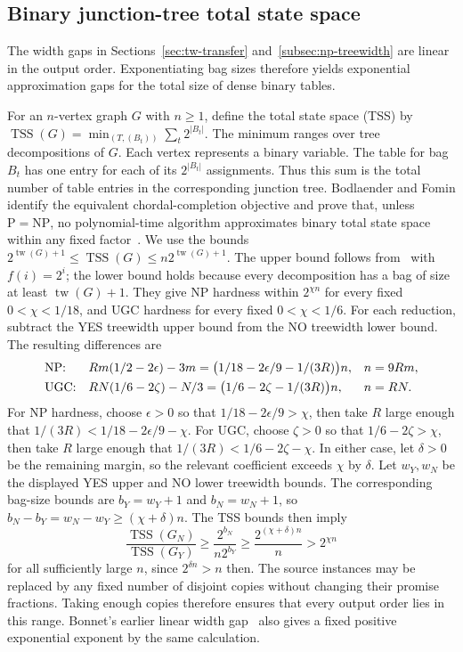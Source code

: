 \subsection{Binary junction-tree total state space}

The width gaps in Sections~\ref{sec:tw-transfer}
and~\ref{subsec:np-treewidth} are linear in the
output order. Exponentiating bag sizes therefore yields exponential
approximation gaps for the total size of dense binary tables.

For an $n$-vertex graph $G$ with $n\ge1$, define the total state space
(TSS) by $\operatorname{TSS}(G)=\min_{(T,(B_t))}\sum_t2^{|B_t|}$.
The minimum ranges over tree decompositions of $G$.
Each vertex represents a binary variable. The table for bag
$B_t$ has one entry for each of its $2^{|B_t|}$ assignments.
Thus this sum is the total number of table entries in the
corresponding junction tree.
Bodlaender and Fomin identify the equivalent chordal-completion
objective and prove that, unless $\mathrm{P}=\mathrm{NP}$, no
polynomial-time algorithm approximates binary total state space within
any fixed factor~\cite[Lemma 2, Section 8, and Theorem 32]{BodlaenderFomin2005}.
We use the bounds
$2^{\operatorname{tw}(G)+1}\leq\operatorname{TSS}(G)\leq n2^{\operatorname{tw}(G)+1}$.
The upper bound follows from~\cite[Lemma~4]{BodlaenderFomin2005} with
$f(i)=2^i$; the lower bound holds because every decomposition has a bag
of size at least $\operatorname{tw}(G)+1$. They give
\textup{NP} hardness within $2^{\chi n}$ for every fixed $0<\chi<1/18$,
and \textup{UGC} hardness for every fixed $0<\chi<1/6$.
For each reduction, subtract the YES treewidth upper bound from the
NO treewidth lower bound. The resulting differences are
\[
 \begin{array}{lll}
 \textup{NP:}&Rm(1/2-2\epsilon)-3m
   =\bigl(1/18-2\epsilon/9-1/(3R)\bigr)n,
   &n=9Rm,\\[4pt]
 \textup{UGC:}&RN(1/6-2\zeta)-N/3
   =\bigl(1/6-2\zeta-1/(3R)\bigr)n,
   &n=RN.
 \end{array}
\]
For \textup{NP} hardness, choose $\epsilon>0$ so that
$1/18-2\epsilon/9>\chi$, then take $R$ large enough that
$1/(3R)<1/18-2\epsilon/9-\chi$. For \textup{UGC}, choose $\zeta>0$ so that
$1/6-2\zeta>\chi$, then take $R$ large enough that
$1/(3R)<1/6-2\zeta-\chi$. In either case, let $\delta>0$ be the
remaining margin, so the relevant coefficient exceeds $\chi$ by
$\delta$. Let $w_Y,w_N$ be the displayed YES upper and NO lower
treewidth bounds. The corresponding bag-size bounds are
$b_Y=w_Y+1$ and $b_N=w_N+1$, so
$b_N-b_Y=w_N-w_Y\geq(\chi+\delta)n$. The TSS bounds then imply
\[
 \frac{\operatorname{TSS}(G_N)}{\operatorname{TSS}(G_Y)}
 \geq\frac{2^{b_N}}{n2^{b_Y}}
 \geq\frac{2^{(\chi+\delta)n}}{n}>2^{\chi n}
\]
for all sufficiently large $n$, since $2^{\delta n}>n$ then.
The source instances may be replaced by any fixed number of disjoint
copies without changing their promise fractions. Taking enough copies
therefore ensures that every output order lies in this range.
Bonnet's earlier linear width gap~\cite{BonnetTreewidth} also gives
a fixed positive exponential exponent by the same calculation.

